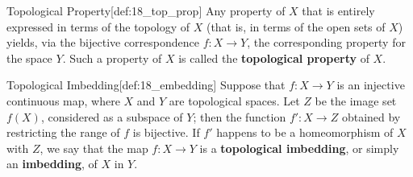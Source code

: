 \begin{defBox}{Topological Property}[def:18_top_prop]
    Any property of \( X \) that is entirely expressed in terms of the 
    topology of \( X \) (that is, in terms of the open sets of \( X \)) yields,
    via the bijective correspondence \( f: X \rightarrow Y \), the corresponding
    property for the space \( Y \).
    Such a property of \( X \) is called the \textbf{topological property} of 
    \( X \).
\end{defBox}

\begin{defBox}{Topological Imbedding}[def:18_embedding]
    Suppose that \( f: X \rightarrow Y \) is an injective continuous map, where
    \( X \) and \( Y \) are topological spaces.
    Let \( Z \) be the image set \( f ( X ) \), considered as a subspace of 
    \( Y \); then the function \( f': X \rightarrow Z \) obtained by restricting
    the range of \( f \) is bijective.
    If \( f' \) happens to be a homeomorphism of \( X \) with \( Z \), we say
    that the map \( f: X \rightarrow Y \) is a \textbf{topological imbedding}, 
    or simply an \textbf{imbedding}, of \( X \) in \( Y \).
\end{defBox}